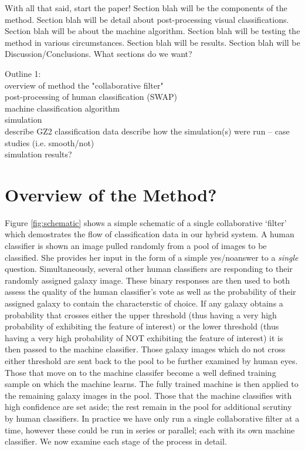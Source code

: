 \documentclass[twocolumn]{aastex6}
\begin{document}
With all that said, start the paper! Section blah will be the components of the method. Section blah will be detail about post-processing visual classifications. Section blah will be about the machine algorithm. Section blah will be testing the method in various circumstances. Section blah will be results. Section blah will be Discussion/Conclusions. 
What sections do we want? 

 Outline 1: \\
overview of method 
\indent the "collaborative filter" \\
\indent  post-processing of human classification (SWAP) \\
\indent machine classification algorithm \\
simulation \\
\indent describe GZ2 classification data
\indent describe  how the simulation(s) were run -- case studies (i.e. smooth/not) \\
\indent simulation results? \\


\section{Overview of the Method?}
Figure \ref{fig:schematic} shows a simple schematic of a single collaborative `filter' which demostrates the flow of classification data in our hybrid system.  A human classifier is shown an image pulled randomly from a pool of images to be classified. She provides her input in the form of a simple yes/noanswer to a \textit{single} question. Simultaneously, several other human classifiers are responding to their randomly assigned galaxy image. These binary responses are then used to both assess the quality of the human classifier's vote as well as the probability of their assigned galaxy to contain the characterstic of choice. If any galaxy obtains a probability that crosses either the upper threshold (thus having a very high probability of exhibiting the feature of interest) or the lower threshold (thus having a very high probability of NOT exhibiting the feature of interest) it is then passed to the machine classifier. Those galaxy images which do not cross either threshold are sent back to the pool to be further examined by human eyes. Those that move on to the machine classifer become a well defined training sample on which the machine learns. The fully trained machine is then applied to the remaining galaxy images in the  pool. Those that the machine classifies with high confidence are set aside; the rest remain in the pool for additional scrutiny by human classifiers.  In practice we have only run a single collaborative filter at a time, however these could be run in series or parallel; each with its own machine classifier. We now examine each stage of the process in detail. 
\end{document}

